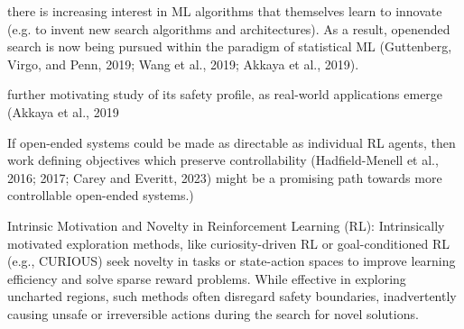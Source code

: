  there is increasing interest in ML
algorithms that themselves learn to innovate (e.g. to invent
new search algorithms and architectures). As a result, openended search is now being pursued within the paradigm of
statistical ML (Guttenberg, Virgo, and Penn, 2019; Wang et
al., 2019; Akkaya et al., 2019). 

further motivating study of its
safety profile, as real-world applications emerge (Akkaya et
al., 2019

If open-ended systems could be made as directable as individual RL agents, then work defining objectives which
preserve controllability (Hadfield-Menell et al., 2016; 2017;
Carey and Everitt, 2023) might be a promising path towards
more controllable open-ended systems.)


Intrinsic Motivation and Novelty in Reinforcement Learning (RL):
Intrinsically motivated exploration methods, like curiosity-driven RL or goal-conditioned RL (e.g., CURIOUS) seek novelty in tasks or state-action spaces to improve learning efficiency and solve sparse reward problems. While effective in exploring uncharted regions, such methods often disregard safety boundaries, inadvertently causing unsafe or irreversible actions during the search for novel solutions.

